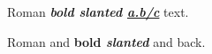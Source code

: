 \documentclass{article}
\begin{document}
Roman \textbf{\textsl{bold slanted \url{a.b/c}}} text.

Roman and {\ttfamily\bfseries bold \slshape slanted} and back.
\end{document}
